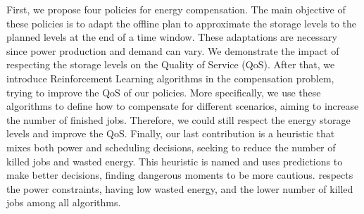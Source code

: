 First, we propose four policies for energy compensation. The main objective of these policies is to adapt the offline plan to approximate the storage levels to the planned levels at the end of a time window. These adaptations are necessary since power production and demand can vary. We demonstrate the impact of respecting the storage levels on the Quality of Service (QoS). After that, we introduce Reinforcement Learning algorithms in the compensation problem, trying to improve the QoS of our policies. More specifically, we use these algorithms to define how to compensate for different scenarios, aiming to increase the number of finished jobs. Therefore, we could still respect the energy storage levels and improve the QoS. Finally, our last contribution is a heuristic that mixes both power and scheduling decisions, seeking to reduce the number of killed jobs and wasted energy. This heuristic is named \emph{\systemName} and uses predictions to make better decisions, finding dangerous moments to be more cautious. \emph{\systemName} respects the power constraints, having low wasted energy, and the lower number of killed jobs among all algorithms.